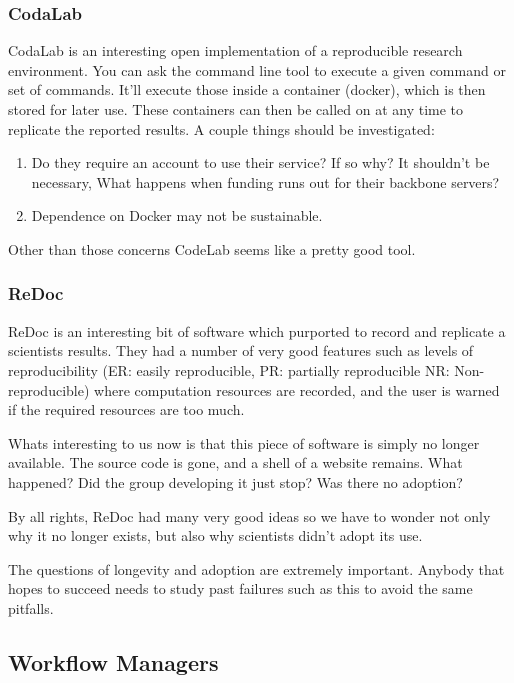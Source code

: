 \documentclass[american]{article}
\begin{document}
\subsubsection{CodaLab}

CodaLab is an interesting open implementation of a reproducible research environment. You can ask the command line tool to execute a given command or set of commands. It'll execute those inside a container (docker), which is then stored for later use. These containers can then be called on at any time to replicate the reported results. A couple things should be investigated:
\begin{enumerate}
\item Do they require an account to use their service? If so why? It shouldn't be necessary, What happens when funding runs out for their backbone servers?
\item Dependence on Docker may not be sustainable.
\end{enumerate}

Other than those concerns CodeLab seems like a pretty good tool.

\subsubsection{ReDoc}

ReDoc is an interesting bit of software which purported to record and replicate a scientists results. They had a number of very good features such as levels of reproducibility (ER: easily reproducible, PR: partially reproducible NR: Non-reproducible) where computation resources are recorded, and the user is warned if the required resources are too much. \cite{claerbout-make-reproducible-2000}

Whats interesting to us now is that this piece of software is simply no longer available. The source code is gone, and a shell of a website remains. What happened? Did the group developing it just stop? Was there no adoption?

By all rights, ReDoc had many very good ideas so we have to wonder not only why it no longer exists, but also why scientists didn't adopt its use.

The questions of longevity and adoption are extremely important. Anybody that hopes to succeed needs to study past failures such as this to avoid the same pitfalls. 

\subsection{Workflow Managers} \label{sec:software-managers}
\end{document}
